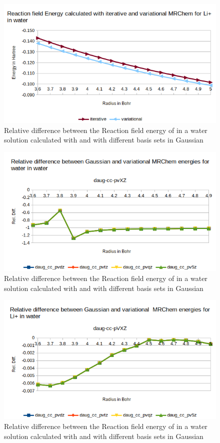 \documentclass[../master_thesis.tex]{subfiles}
\begin{document}
\begin{figure}[h!]
  \centering
  \includegraphics[width=0.75\linewidth]{img/lipvarEr.png}
  \caption{Relative difference between the Reaction field energy of  in a water solution calculated with \mrchem
  and with different basis sets in Gaussian}
  \label{fig:lipvarEr}
\end{figure}

\begin{figure}[h!]
  \centering
    \includegraphics[width=\linewidth]{img/watvardaugreldiff.png}
  \caption{Relative difference between the Reaction field energy of  in a water solution calculated with \mrchem
  and with different basis sets in Gaussian}
  \label{fig:watreldiffvardaug}
\end{figure}

\begin{figure}[h!]
  \centering
    \includegraphics[width=\linewidth]{img/lipvardaugreldiff.png}
  \caption{Relative difference between the Reaction field energy of  in a water solution calculated with \mrchem
  and with different basis sets in Gaussian}
  \label{fig:lipreldiffvardaug}
\end{figure}
\end{document}
